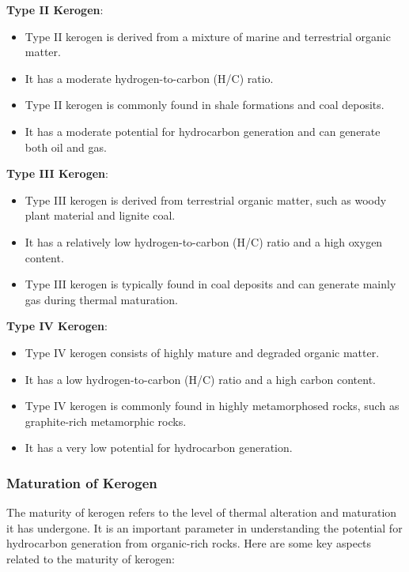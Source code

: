 \documentclass{article}
\begin{document}
\textbf{Type II Kerogen}:
    \begin{itemize}
        \item Type II kerogen is derived from a mixture of marine and terrestrial organic matter.
        \item It has a moderate hydrogen-to-carbon (H/C) ratio.
        \item Type II kerogen is commonly found in shale formations and coal deposits.
        \item It has a moderate potential for hydrocarbon generation and can generate both oil and gas.
    \end{itemize}

\textbf{Type III Kerogen}:
    \begin{itemize}
        \item Type III kerogen is derived from terrestrial organic matter, such as woody plant material and lignite coal.
        \item It has a relatively low hydrogen-to-carbon (H/C) ratio and a high oxygen content.
        \item Type III kerogen is typically found in coal deposits and can generate mainly gas during thermal maturation.
    \end{itemize}

\textbf{Type IV Kerogen}:
    \begin{itemize}
        \item Type IV kerogen consists of highly mature and degraded organic matter.
        \item It has a low hydrogen-to-carbon (H/C) ratio and a high carbon content.
        \item Type IV kerogen is commonly found in highly metamorphosed rocks, such as graphite-rich metamorphic rocks.
        \item It has a very low potential for hydrocarbon generation.
    \end{itemize}

\subsubsection*{Maturation of Kerogen}
The maturity of kerogen refers to the level of thermal alteration and maturation it has undergone. It is an important parameter in understanding the potential for hydrocarbon generation from organic-rich rocks. Here are some key aspects related to the maturity of kerogen:\\
\end{document}
